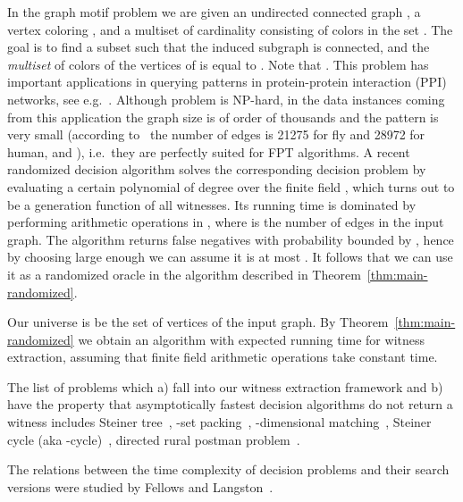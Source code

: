 \documentclass[11pt]{article}
\begin{document}
In the graph motif problem we are given an undirected connected graph , a vertex coloring , and a multiset  of cardinality  consisting of colors in the set . The goal is to find a subset  such that the induced subgraph  is connected, and the {\em multiset}  of colors of the vertices of  is equal to . Note that . 
This problem has important applications in querying patterns in protein-protein interaction (PPI) networks, see e.g.~\cite{BrucknerRECOMB09}.
Although problem is NP-hard, in the data instances coming from this application the graph size is of order of thousands and the pattern is very small (according to~\cite{BrucknerRECOMB09} the number of edges is 21275 for fly and 28972 for human, and ), i.e.\ they are perfectly suited for FPT algorithms.
A recent randomized decision algorithm \cite{BjorklundKaskiKowalik2013} solves the corresponding decision problem by evaluating a certain polynomial of degree  over the finite field , which turns out to be a generation function of all witnesses.
Its running time is dominated by performing  arithmetic operations in , where  is the number 
of edges in the input graph. The algorithm returns false negatives with probability bounded by , hence by choosing  large enough we can assume it is at most . It follows that we can use it as a randomized oracle in the algorithm described in Theorem~\ref{thm:main-randomized}.

Our universe  is be the set of vertices of the input graph. By Theorem~\ref{thm:main-randomized} we obtain an algorithm with expected running time 
 for witness extraction, assuming that finite field arithmetic operations take constant time.

The list of problems which a) fall into our witness extraction framework and b) have the property that asymptotically fastest decision algorithms do not return a witness includes Steiner tree~\cite{jesper-st}, -set packing~\cite{BjorklundHusfeldtKaskiKoivisto2010}, -dimensional matching~\cite{BjorklundHusfeldtKaskiKoivisto2010}, Steiner cycle (aka -cycle)~\cite{BjorklundHusfeldtTaslaman2012,Wahlstrom2013}, directed rural postman problem~\cite{Wahlstrom+2013}.

The relations between the time complexity of decision problems and their search versions were studied by Fellows and Langston~\cite{FellowsL:STOC89}.
\end{document}
